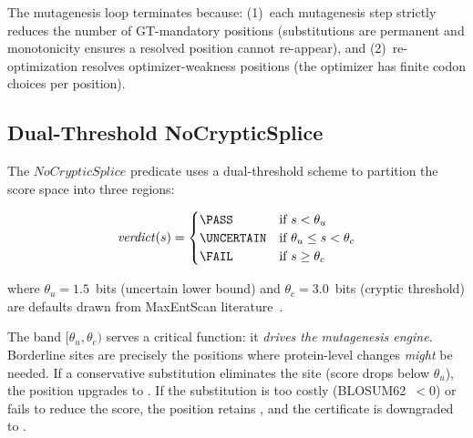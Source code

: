 \begin{proposition}[Termination]
The mutagenesis loop terminates because:
(1)~each mutagenesis step strictly reduces the number of
GT-mandatory positions (substitutions are permanent and
monotonicity ensures a resolved position cannot re-appear), and
(2)~re-optimization resolves optimizer-weakness positions
(the optimizer has finite codon choices per position).
\end{proposition}

\subsection{Dual-Threshold NoCrypticSplice}\label{sec:dualthresh}

The $\mathit{NoCrypticSplice}$ predicate uses a dual-threshold scheme
to partition the score space into three regions:

\begin{equation}\label{eq:dualthresh}
\mathit{verdict}(s) =
\begin{cases}
  \PASS      & \text{if } s < \theta_u \\
  \UNCERTAIN & \text{if } \theta_u \le s < \theta_c \\
  \FAIL      & \text{if } s \ge \theta_c
\end{cases}
\end{equation}

where $\theta_u = 1.5$~bits (uncertain lower bound) and
$\theta_c = 3.0$~bits (cryptic threshold) are defaults drawn from
MaxEntScan literature~\cite{yeo2004maxentscan}.

The \UNCERTAIN{} band $[\theta_u, \theta_c)$ serves a critical
function: it \emph{drives the mutagenesis engine}.
Borderline sites are precisely the positions where protein-level
changes \emph{might} be needed.
If a conservative substitution eliminates the site (score drops below
$\theta_u$), the position upgrades to \PASS.
If the substitution is too costly (BLOSUM62~$< 0$) or fails to reduce
the score, the position retains \UNCERTAIN{}, and the certificate is
downgraded to \BRONZE.

